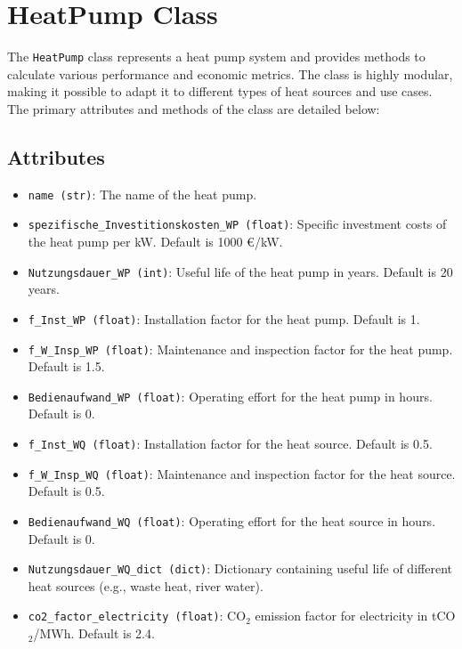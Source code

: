 \section{HeatPump Class}
The \texttt{HeatPump} class represents a heat pump system and provides methods to calculate various performance and economic metrics. The class is highly modular, making it possible to adapt it to different types of heat sources and use cases. The primary attributes and methods of the class are detailed below:

\subsection{Attributes}
\begin{itemize}
    \item \texttt{name (str)}: The name of the heat pump.
    \item \texttt{spezifische\_Investitionskosten\_WP (float)}: Specific investment costs of the heat pump per kW. Default is 1000 €/kW.
    \item \texttt{Nutzungsdauer\_WP (int)}: Useful life of the heat pump in years. Default is 20 years.
    \item \texttt{f\_Inst\_WP (float)}: Installation factor for the heat pump. Default is 1.
    \item \texttt{f\_W\_Insp\_WP (float)}: Maintenance and inspection factor for the heat pump. Default is 1.5.
    \item \texttt{Bedienaufwand\_WP (float)}: Operating effort for the heat pump in hours. Default is 0.
    \item \texttt{f\_Inst\_WQ (float)}: Installation factor for the heat source. Default is 0.5.
    \item \texttt{f\_W\_Insp\_WQ (float)}: Maintenance and inspection factor for the heat source. Default is 0.5.
    \item \texttt{Bedienaufwand\_WQ (float)}: Operating effort for the heat source in hours. Default is 0.
    \item \texttt{Nutzungsdauer\_WQ\_dict (dict)}: Dictionary containing useful life of different heat sources (e.g., waste heat, river water).
    \item \texttt{co2\_factor\_electricity (float)}: CO$_2$ emission factor for electricity in tCO$_2$/MWh. Default is 2.4.
\end{itemize}

